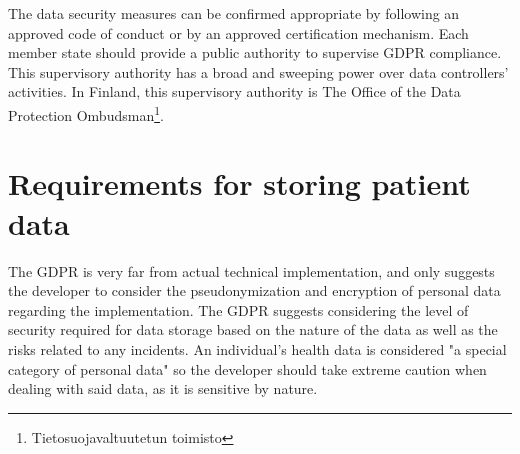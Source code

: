 The data security measures can be confirmed appropriate by following an approved code of conduct or by an approved certification mechanism.
Each member state should provide a public authority to supervise GDPR compliance.
This supervisory authority has a broad and sweeping power over data controllers' activities.
\cite{gdpr}
In Finland, this supervisory authority is The Office of the Data Protection Ombudsman\footnote{Tietosuojavaltuutetun toimisto}. \cite{tietosuojavaltuutettu}

\section{Requirements for storing patient data}

The GDPR is very far from actual technical implementation, and only suggests the developer to consider the pseudonymization and encryption of personal data regarding the implementation.
The GDPR suggests considering the level of security required for data storage based on the nature of the data as well as the risks related to any incidents.
An individual's health data is considered "a special category of personal data" so the developer should take extreme caution when dealing with said data, as it is sensitive by nature.
\cite{gdpr}

